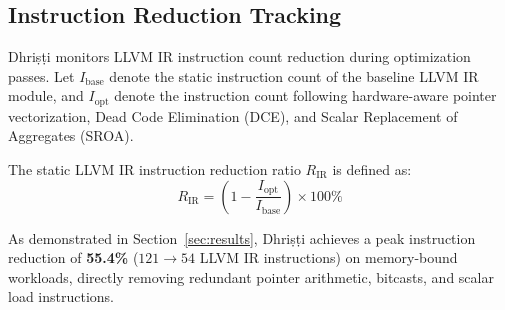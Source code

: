 \documentclass[10pt,journal,compsoc]{IEEEtran}
\begin{document}
\subsection{Instruction Reduction Tracking}
Dhri\d{s}\d{t}i monitors LLVM IR instruction count reduction during optimization passes. Let $I_{\text{base}}$ denote the static instruction count of the baseline LLVM IR module, and $I_{\text{opt}}$ denote the instruction count following hardware-aware pointer vectorization, Dead Code Elimination (DCE), and Scalar Replacement of Aggregates (SROA).

The static LLVM IR instruction reduction ratio $R_{\text{IR}}$ is defined as:
\begin{equation}
R_{\text{IR}} = \left( 1 - \frac{I_{\text{opt}}}{I_{\text{base}}} \right) \times 100\%
\end{equation}

As demonstrated in Section~\ref{sec:results}, Dhri\d{s}\d{t}i achieves a peak instruction reduction of \textbf{55.4\%} ($121 \rightarrow 54$ LLVM IR instructions) on memory-bound workloads, directly removing redundant pointer arithmetic, bitcasts, and scalar load instructions.
\end{document}
